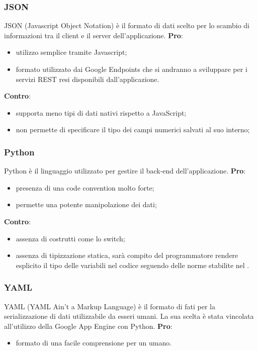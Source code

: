 		\subsubsection{JSON} %
		\label{ssub:json}
		JSON (Javascript Object Notation) è il formato di dati scelto per lo scambio di informazioni tra il client e il server dell'applicazione. \newline
		\textbf{Pro}:
			\begin{itemize}
				\item utilizzo semplice tramite Javascript;
				\item formato utilizzato dai Google Endpoints che si andranno a sviluppare per i servizi REST resi disponibili dall'applicazione. 
			\end{itemize}
			\noindent
			\textbf{Contro}:
			\begin{itemize}
				\item supporta meno tipi di dati nativi rispetto a JavaScript;
				\item non permette di specificare il tipo dei campi numerici salvati al suo interno;
			\end{itemize}
		\noindent

		\subsubsection{Python} %
		\label{sub:python}
		Python è il linguaggio utilizzato per gestire il back-end dell'applicazione. \newline
		\textbf{Pro}:
			\begin{itemize}
				\item presenza di una code convention molto forte;
				\item permette una potente manipolazione dei dati;
			\end{itemize}
		\noindent
		\newline
		\textbf{Contro}:
			\begin{itemize}
				\item assenza di costrutti come lo switch;
				\item assenza di tipizzazione statica, sarà compito del programmatore rendere esplicito il tipo delle variabili nel codice seguendo delle norme stabilite nel \docNameVersionNdP.
			\end{itemize}
		\noindent

		\subsubsection{YAML} %
		\label{ssub:yaml}
		YAML (YAML Ain't a Markup Language) è il formato di fati per la serializzazione di dati utilizzabile da esseri umani. \newline
		La sua scelta è stata vincolata all'utilizzo della Google App Engine con Python. \newline
		\textbf{Pro}:
			\begin{itemize}
				\item formato di una facile comprensione per un umano.
			\end{itemize}
		\noindent

